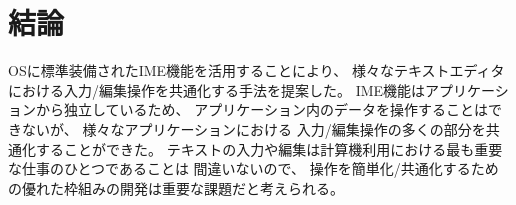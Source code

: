 \section{結論}

OSに標準装備されたIME機能を活用することにより、
様々なテキストエディタにおける入力/編集操作を共通化する手法を提案した。
IME機能はアプリケーションから独立しているため、
アプリケーション内のデータを操作することはできないが、
様々なアプリケーションにおける
入力/編集操作の多くの部分を共通化することができた。
%
テキストの入力や編集は計算機利用における最も重要な仕事のひとつであることは
間違いないので、
操作を簡単化/共通化するための優れた枠組みの開発は重要な課題だと考えられる。

